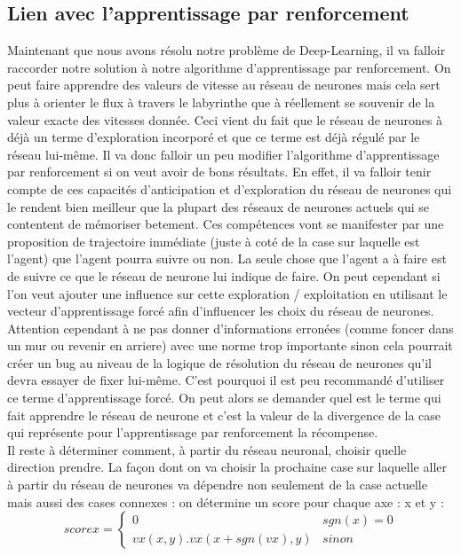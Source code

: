 \documentclass[10pt]{article}
\begin{document}
\subsection{Lien avec l'apprentissage par renforcement}
Maintenant que nous avons résolu notre problème de Deep-Learning, il va falloir raccorder notre solution à notre algorithme d'apprentissage par renforcement. On peut faire apprendre des valeurs de vitesse au réseau de neurones mais cela sert plus à orienter le flux à travers le labyrinthe que à réellement se souvenir de la valeur exacte des vitesses donnée. Ceci vient du fait que le réseau de neurones à déjà un terme d'exploration incorporé et que ce terme est déjà régulé par le réseau lui-même. Il va donc falloir un peu modifier l'algorithme d'apprentissage par renforcement si on veut avoir de bons résultats. En effet, il va falloir tenir compte de ces capacités d'anticipation et d'exploration du réseau de neurones qui le rendent bien meilleur que la plupart des réseaux de neurones actuels qui se contentent de mémoriser betement. Ces compétences vont se manifester par une proposition de trajectoire immédiate (juste à coté de la case sur laquelle est l'agent) que l'agent pourra suivre ou non. La seule chose que l'agent a à faire est de suivre ce que le réseau de neurone lui indique de faire. On peut cependant si l'on veut ajouter une influence sur cette exploration / exploitation en utilisant le vecteur d'apprentissage forcé afin d'influencer les choix du réseau de neurones. Attention cependant à ne pas donner d'informations erronées (comme foncer dans un mur ou revenir en arriere) avec une norme trop importante sinon cela pourrait créer un bug au niveau de la logique de résolution du réseau de neurones qu'il devra essayer de fixer lui-même. C'est pourquoi il est peu recommandé d'utiliser ce terme d'apprentissage forcé. On peut alors se demander quel est le terme qui fait apprendre le réseau de neurone et c'est la valeur de la divergence de la case qui représente pour l'apprentissage par renforcement la récompense.\\
Il reste à déterminer comment, à partir du réseau neuronal, choisir quelle direction prendre. La façon dont on va choisir la prochaine case sur laquelle aller à partir du réseau de neurones va dépendre non seulement de la case actuelle mais aussi des cases connexes : on détermine un score pour chaque axe : x et y :
\[scorex = 
\begin{cases}
	0 & sgn(x) = 0 \\
	vx(x,y).vx(x+sgn(vx),y) & sinon
\end{cases}
\]
\end{document}
